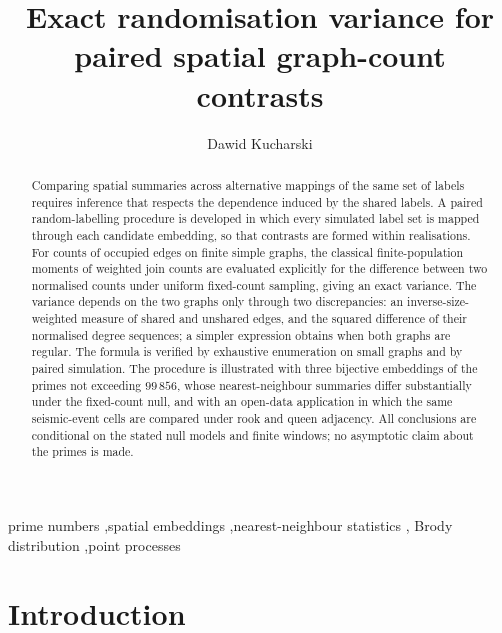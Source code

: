 \documentclass[final,1p,times,authoryear]{elsarticle}
\theoremstyle{definition}
\begin{document}
\begin{frontmatter}

\title{Exact randomisation variance for paired spatial graph-count contrasts}

\author[put]{Dawid Kucharski}

\begin{abstract}
Comparing spatial summaries across alternative mappings of the same set of
labels requires inference that respects the dependence induced by the shared
labels. A paired random-labelling procedure is developed in which every
simulated label set is mapped through each candidate embedding, so that
contrasts are formed within realisations. For counts of occupied edges on
finite simple graphs, the classical finite-population moments of weighted
join counts are evaluated explicitly for the difference between two
normalised counts under uniform fixed-count sampling, giving an exact
variance.
The variance depends on the two graphs only through two discrepancies: an
inverse-size-weighted measure of shared and unshared edges, and the squared
difference of their normalised degree sequences; a simpler expression obtains
when both graphs are regular. The formula is verified by exhaustive
enumeration on small graphs and by paired simulation. The procedure is
illustrated with three bijective embeddings of the primes not exceeding
$99\,856$, whose nearest-neighbour summaries differ substantially under the
fixed-count null, and with an open-data application in which the same
seismic-event cells are compared under rook and queen adjacency. All
conclusions are conditional on the stated null models and finite windows; no
asymptotic claim about the primes is made.
\end{abstract}

\begin{keyword}
prime numbers \sep spatial embeddings \sep nearest-neighbour statistics \sep
Brody distribution \sep point processes
\end{keyword}

\end{frontmatter}

\section{Introduction}
\end{document}
